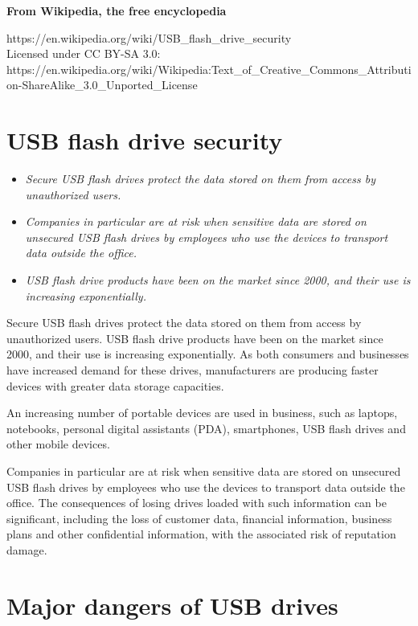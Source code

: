 \textbf{From Wikipedia, the free encyclopedia}

https://en.wikipedia.org/wiki/USB\_flash\_drive\_security\\
Licensed under CC BY-SA 3.0:\\
https://en.wikipedia.org/wiki/Wikipedia:Text\_of\_Creative\_Commons\_Attribution-ShareAlike\_3.0\_Unported\_License

\section{USB flash drive security}\label{usb-flash-drive-security}

\begin{itemize}
\item
  \emph{Secure USB flash drives protect the data stored on them from
  access by unauthorized users.}
\item
  \emph{Companies in particular are at risk when sensitive data are
  stored on unsecured USB flash drives by employees who use the devices
  to transport data outside the office.}
\item
  \emph{USB flash drive products have been on the market since 2000, and
  their use is increasing exponentially.}
\end{itemize}

Secure USB flash drives protect the data stored on them from access by
unauthorized users. USB flash drive products have been on the market
since 2000, and their use is increasing exponentially. As both consumers
and businesses have increased demand for these drives, manufacturers are
producing faster devices with greater data storage capacities.

An increasing number of portable devices are used in business, such as
laptops, notebooks, personal digital assistants (PDA), smartphones, USB
flash drives and other mobile devices.

Companies in particular are at risk when sensitive data are stored on
unsecured USB flash drives by employees who use the devices to transport
data outside the office. The consequences of losing drives loaded with
such information can be significant, including the loss of customer
data, financial information, business plans and other confidential
information, with the associated risk of reputation damage.

\section{Major dangers of USB drives}\label{major-dangers-of-usb-drives}

